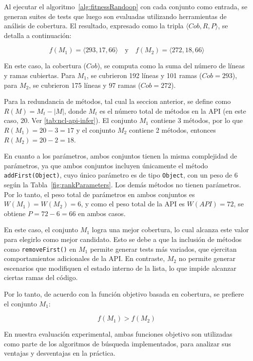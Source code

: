 Al ejecutar el algoritmo~\ref{alg:fitnessRandoop} con cada conjunto como entrada, se generan suites de tests que luego son evaluadas utilizando herramientas de análisis de cobertura. 
El resultado, expresado como la tripla \( \langle Cob, R, P \rangle \), se detalla a continuación:

\[
f(M_1) = \langle 293, 17, 66 \rangle \quad \text{y} \quad f(M_2) = \langle 272, 18, 66 \rangle
\]

En este caso, la cobertura  (\(Cob\)), se computa como la suma del número de líneas y ramas cubiertas.
Para \( M_1 \), se cubrieron 192 líneas y 101 ramas (\(Cob = 293\)), para \( M_2 \), se cubrieron 175 líneas y 97 ramas (\(Cob = 272\)).

Para la redundancia de métodos, tal cual la seccion anterior, se define como \( R(M) = M_t - |M| \), donde \( M_t \) es el número total de métodos en la API (en este caso, 20. Ver \ref{tab:ncl-api-infer}). 
El conjunto \( M_1 \) contiene 3 métodos, por lo que \( R(M_1) = 20 - 3 = 17 \) y el conjunto \( M_2 \) contiene 2 métodos, entonces \( R(M_2) = 20 - 2 = 18 \).

En cuanto a los parámetros, ambos conjuntos tienen la misma complejidad de parámetros, ya que ambos conjuntos incluyen únicamente el método \texttt{addFirst(Object)}, cuyo único parámetro es de tipo \texttt{Object}, con un peso de 6 según la Tabla~\ref{fig:rankParameters}. 
Los demás métodos no tienen parámetros. Por lo tanto, el peso total de parámetros en ambos conjuntos es \( W(M_1) = W(M_2) = 6 \), y como el peso total de la API es \( W(API) = 72 \), se obtiene \( P = 72 - 6 = 66 \) en ambos casos.

En este caso, el conjunto \( M_1 \) logra una mejor cobertura, lo cual alcanza este valor para elegirlo como mejor candidato. 
Esto se debe a que la inclusión de métodos como \texttt{removeFirst()} en \( M_1 \) permite generar tests más variados, que ejercitan comportamientos adicionales de la API. 
En contraste, \( M_2 \) no permite generar escenarios que modifiquen el estado interno de la lista, lo que impide alcanzar ciertas ramas del código.

Por lo tanto, de acuerdo con la función objetivo basada en cobertura, se prefiere el conjunto \( M_1 \):

\[
f(M_1) > f(M_2)
\]


En nuestra evaluación experimental, ambas funciones objetivo son utilizadas como
parte de los algoritmos de búsqueda implementados, para analizar sus ventajas y
desventajas en la práctica. 


